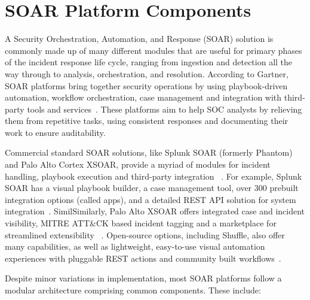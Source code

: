\section{SOAR Platform Components}

A Security Orchestration, Automation, and Response (SOAR) solution is commonly made up of many different modules that are useful for primary phases of the incident response life cycle, ranging from ingestion and detection all the way through to analysis, orchestration, and resolution. According to Gartner, SOAR platforms bring together security operations by using playbook-driven automation, workflow orchestration, case management and integration with third-party tools and services~\cite{gartner-siem-soar}. These platforms aim to help SOC analysts by relieving them from repetitive tasks, using consistent responses and documenting their work to ensure auditability.

Commercial standard SOAR solutions, like Splunk SOAR (formerly Phantom) and Palo Alto Cortex XSOAR, provide a myriad of modules for incident handling, playbook execution and third-party integration ~\cite{splunk, paloalto}. For example, Splunk SOAR has a visual playbook builder, a case management tool, over 300 prebuilt integration options (called apps), and a detailed REST API solution for system integration~\cite{splunk}. SimilSimilarly, Palo Alto XSOAR offers integrated case and incident visibility, MITRE ATT\&CK based incident tagging and a marketplace for streamlined extensibility ~\cite{paloalto}. Open-source options, including Shuffle, also offer many capabilities, as well as lightweight, easy-to-use visual automation experiences with pluggable REST actions and community built workflows~\cite{techtarget}.

Despite minor variations in implementation, most SOAR platforms follow a modular architecture comprising common components. These include:

